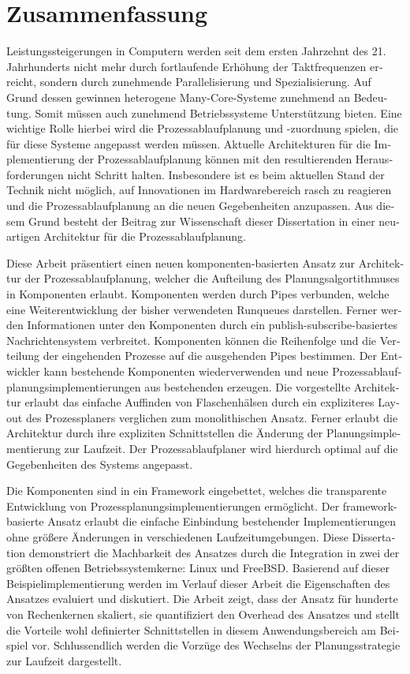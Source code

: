 \chapter*{Zusammenfassung}

\begin{otherlanguage}{ngerman}

Leistungssteigerungen in Computern werden seit dem ersten Jahrzehnt des 21. Jahrhunderts nicht mehr durch fortlaufende Erhöhung der Taktfrequenzen erreicht, sondern durch zunehmende Parallelisierung und Spezialisierung. Auf Grund dessen gewinnen heterogene Many-Core-Systeme zunehmend an Bedeutung. Somit müssen auch zunehmend Betriebssysteme Unterstützung bieten. Eine wichtige Rolle hierbei wird die Prozessablaufplanung und -zuordnung spielen, die für diese Systeme angepasst werden müssen. Aktuelle Architekturen für die Implementierung der Prozessablaufplanung können mit den resultierenden Herausforderungen nicht Schritt halten. Insbesondere ist es beim aktuellen Stand der Technik nicht möglich, auf Innovationen im Hardwarebereich rasch zu reagieren und die Prozessablaufplanung an die neuen Gegebenheiten anzupassen. Aus diesem Grund besteht der Beitrag zur Wissenschaft dieser Dissertation in einer neuartigen Architektur für die Prozessablaufplanung.

Diese Arbeit präsentiert einen neuen komponenten-basierten Ansatz zur Architektur der Prozessablaufplanung, welcher die Aufteilung des Planungsalgortithmuses in Komponenten erlaubt. Komponenten werden durch Pipes verbunden, welche eine Weiterentwicklung der bisher verwendeten Runqueues darstellen. Ferner werden Informationen unter den Komponenten durch ein publish-subscribe-basiertes Nachrichtensystem verbreitet. Komponenten können die Reihenfolge und die Verteilung der eingehenden Prozesse auf die ausgehenden Pipes bestimmen. Der Entwickler kann bestehende Komponenten wiederverwenden und neue Prozessablaufplanungsimplementierungen aus bestehenden erzeugen. Die vorgestellte Architektur erlaubt das einfache Auffinden von Flaschenhälsen durch ein expliziteres Layout des Prozessplaners verglichen zum monolithischen Ansatz. Ferner erlaubt die Architektur durch ihre expliziten Schnittstellen die Änderung der Planungsimplementierung zur Laufzeit. Der Prozessablaufplaner wird hierdurch optimal auf die Gegebenheiten des Systems angepasst.

Die Komponenten sind in ein Framework eingebettet, welches die transparente Entwicklung von Prozessplanungsimplementierungen ermöglicht. Der framework-basierte Ansatz erlaubt die einfache Einbindung bestehender Implementierungen ohne größere Änderungen in verschiedenen Laufzeitumgebungen. Diese Dissertation demonstriert die Machbarkeit des Ansatzes durch die Integration in zwei der größten offenen Betriebssystemkerne: Linux und FreeBSD. Basierend auf dieser Beispielimplementierung werden im Verlauf dieser Arbeit die Eigenschaften des Ansatzes evaluiert und diskutiert. Die Arbeit zeigt, dass der Ansatz für hunderte von Rechenkernen skaliert, sie quantifiziert den Overhead des Ansatzes und stellt die Vorteile wohl definierter Schnittstellen in diesem Anwendungsbereich am Beispiel vor. Schlussendlich werden die Vorzüge des Wechselns der Planungsstrategie zur Laufzeit dargestellt.

\end{otherlanguage}